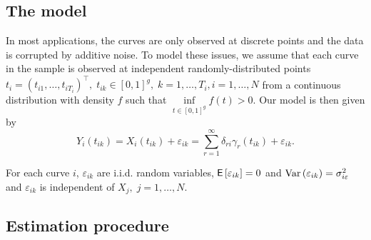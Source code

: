 \subsection{The model}\label{themodel}

In most applications, the curves are only observed at discrete points and the data is corrupted by additive noise. To model these issues, 
we assume that each curve in the sample is observed at independent randomly-distributed points $t_i=(t_{i1},\dots,t_{iT_i})^{\top}, \; t_{ik} \in [0,1]^g, \; k=1,\dots, T_i, i=1,\dots, N$ from a continuous distribution with density $f$ such that $\underset{t\in[0,1]^g}{\operatorname{inf}}f(t)>0$. Our model is then given by 
\begin{equation} \label{basic} 
Y_i(t_{ik})=X_i(t_{ik}) + \varepsilon_{ik} =\sum_{r=1}^\infty \delta_{ri} \gamma_r(t_{ik})+\varepsilon_{ik}.
\end{equation}

For each curve $i$, $\varepsilon_{ik}$ are i.i.d. random variables, $\mathop{\mbox{\sf E}}\left[\varepsilon_{ik}\right]=0$ and $\operatorname{Var}\left(\varepsilon_{ik}\right)= \sigma_{i \varepsilon}^2$ and $\varepsilon_{ik}$ is independent of $X_j, \; j=1,\dots,N$. 

\subsection{Estimation procedure}

